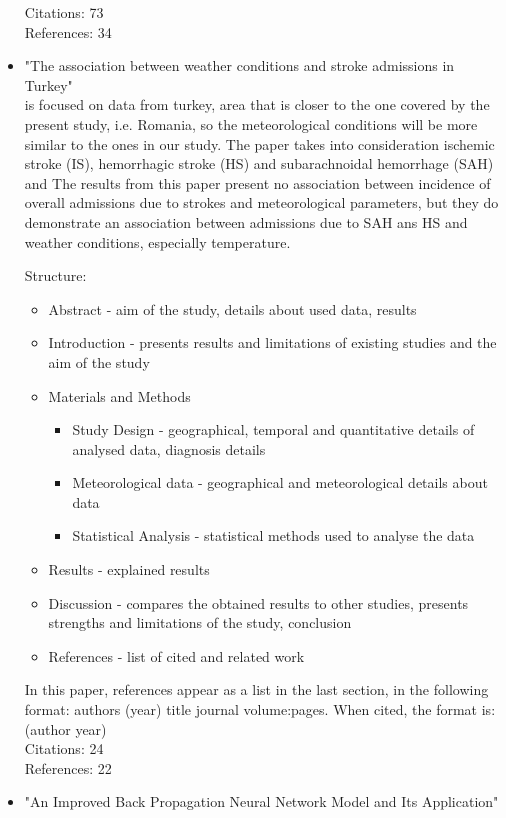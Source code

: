 \documentclass{article}
\begin{document}
\begin{itemize}
Citations: 73\\
References: 34

\item\large "The association between weather conditions and stroke admissions in Turkey"\\

\normalsize \cite{Çevik:2015dg} is focused on data from turkey, area that is closer to the one covered by the present study, i.e. Romania, so the meteorological conditions will be more similar to the ones in our study. The paper takes into consideration ischemic stroke (IS), hemorrhagic stroke (HS) and subarachnoidal hemorrhage (SAH) and The results from this paper present no association between incidence of overall admissions due to strokes and meteorological parameters, but they do demonstrate an association between admissions due to SAH ans HS and weather conditions, especially temperature. 

Structure:
\begin{itemize}
\item Abstract - aim of the study, details about used data, results
\item Introduction - presents results and limitations of existing studies and the aim of the study
\item Materials and Methods 
\begin{itemize}
\item Study Design - geographical, temporal and quantitative details of analysed data, diagnosis details
\item Meteorological data - geographical and meteorological details about data
\item Statistical Analysis - statistical methods used to analyse the data
\end{itemize}
\item Results - explained results
\item Discussion - compares the obtained results to other studies, presents strengths and limitations of the study, conclusion
\item References - list of cited and related work
\end{itemize}
In this paper, references appear as a list in the last section, in the following format: authors (year) title journal volume:pages. When cited, the format is: (author year)\\

Citations: 24\\
References: 22

\item\large "An Improved Back Propagation Neural Network Model and Its Application"\\


\end{itemize}
\end{document}
